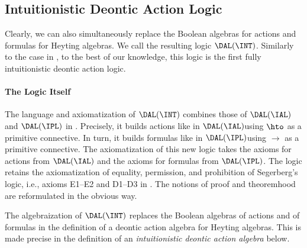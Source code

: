 \subsection{Intuitionistic Deontic Action Logic}

Clearly, we can also simultaneously replace the Boolean algebras for actions and formulas for Heyting algebras.
We call the resulting logic $\DAL(\INT)$.
Similarly to the case in , to the best of our knowledge, this logic is the first fully intuitionistic deontic action logic.



\paragraph{The Logic Itself}

The language and axiomatization of $\DAL(\INT)$ combines those of $\DAL(\IAL)$ and $\DAL(\IPL)$ in .
Precisely, it builds actions like in $\DAL(\IAL)$\textemdash using $\hto$ as a primitive connective.
In turn, it builds formulas like in $\DAL(\IPL)$\textemdash using $\to$ as a primitive connective.
The axiomatization of this new logic takes the axioms for actions from $\DAL(\IAL)$ and the axioms for formulas from $\DAL(\IPL)$.
The logic retains the axiomatization of equality, permission, and prohibition of Segerberg's logic, i.e., axioms E1--E2 and D1--D3 in .
The notions of proof and theoremhood are reformulated in the obvious way.

The algebraization of $\DAL(\INT)$ replaces the Boolean algebras of actions and of formulas in the definition of a deontic action algebra for Heyting algebras. This is made precise in the definition of an \emph{intuitionistic deontic action algebra} below.

\medskip
{}
\medskip

